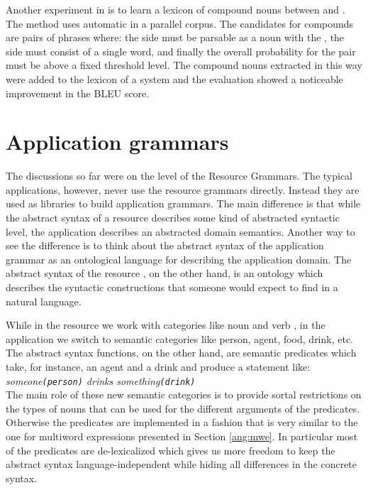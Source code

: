 \documentclass[output=paper]{langsci/langscibook}
\begin{document}
Another experiment in \cite{enache2014handling} is to learn
a lexicon of compound nouns between  and . The method
uses automatic  in a parallel corpus. The candidates for
compounds are pairs of phrases where: the  side must be parsable
as a noun  with the  , the  side must consist
of a single word, and finally the overall probability for the pair must
be above a fixed threshold level. The compound nouns extracted in this
way were added to the lexicon of a 
system and the evaluation showed a noticeable improvement in the BLEU
score.

\section{Application grammars}

The discussions so far were on the level of the Resource Grammars.
The typical  applications, however, never use the resource grammars
directly. Instead they are used as libraries to build application grammars.
The main difference is that while the abstract syntax of a resource 
describes some kind of abstracted syntactic level, the application
 describes an abstracted domain semantics. Another way to see
the difference is to think about the abstract syntax of the application grammar as an ontological
language for describing the application domain. The abstract syntax
of the resource , on the other hand, is an ontology which describes
the syntactic constructions that someone would expect to find in a natural
language.

While in the resource  we work with categories like noun 
and verb , in the application  we switch to semantic
categories like person, agent, food, drink, etc. The abstract syntax
functions, on the other hand, are semantic predicates which take, for instance,
an agent and a drink and produce a statement like:\\[10pt]
%
{\phantom{X}\qquad\qquad \textit{someone\texttt{(person)} drinks something\texttt{(drink)}}}\\[10pt]
%
The main role of these new semantic categories is to provide 
sortal restrictions on the types of nouns that can be used for the
different arguments of the predicates. Otherwise the predicates are
implemented in a fashion that is very similar to the one for
multiword expressions presented in Section \ref{ang:mwe}.
In particular most of the predicates are de-lexicalized which
gives us more freedom to keep the abstract syntax language-independent
while hiding all differences in the concrete syntax. 
\end{document}
